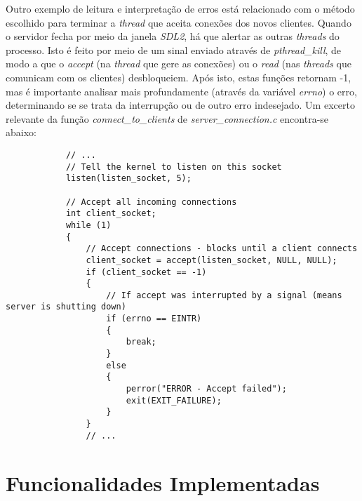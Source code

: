 \documentclass[a4paper]{report}
\begin{document}
        \par Outro exemplo de leitura e interpretação de erros está relacionado com o método escolhido para terminar a \textit{thread} que aceita conexões dos novos clientes. Quando o servidor fecha por meio da janela \textit{SDL2}, há que alertar as outras \textit{threads} do processo. Isto é feito por meio de um sinal enviado através de \textit{pthread\_kill}, de modo a que o \textit{accept} (na \textit{thread} que gere as conexões) ou o \textit{read} (nas \textit{threads} que comunicam com os clientes) desbloqueiem. Após isto, estas funções retornam -1, mas é importante analisar mais profundamente (através da variável \textit{errno}) o erro, determinando se se trata da interrupção ou de outro erro indesejado. Um excerto relevante da função \textit{connect\_to\_clients} de \textit{server\_connection.c} encontra-se abaixo:
        
        \begin{lstlisting}
            // ...
            // Tell the kernel to listen on this socket
            listen(listen_socket, 5);

            // Accept all incoming connections
            int client_socket;
            while (1)
            {
                // Accept connections - blocks until a client connects
                client_socket = accept(listen_socket, NULL, NULL);
                if (client_socket == -1)
                {
                    // If accept was interrupted by a signal (means server is shutting down)
                    if (errno == EINTR)
                    {
                        break;
                    }
                    else
                    {
                        perror("ERROR - Accept failed");
                        exit(EXIT_FAILURE);
                    }
                }
                // ...
        \end{lstlisting}

    \section{Funcionalidades Implementadas}
\end{document}
